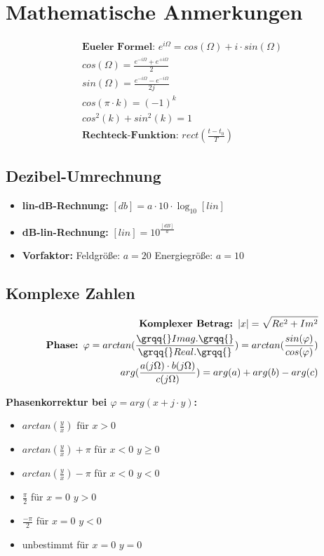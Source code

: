 \documentclass[10pt,a4paper]{article}
\begin{document}
\section{Mathematische Anmerkungen}
\begin{mdframed}[style=exercise]
    \begin{align}
     \textbf{Eueler Formel: } e^{i\Omega} = cos(\Omega) + i\cdot sin(\Omega)\\
     cos(\Omega) = \frac{e^{-i\Omega}+e^{+i\Omega}}{2}\\
     sin(\Omega) = \frac{e^{-i\Omega}-e^{-i\Omega}}{2j}\\
     cos(\pi\cdot k) = (-1)^{k}\\
     cos^{2}(k)+sin^{2}(k)=1\\
    \textbf{Rechteck-Funktion: } rect(\frac{t-t_{0}}{T})
    \end{align}
\end{mdframed}

\subsection{Dezibel-Umrechnung}
\begin{itemize}
	\item \textbf{lin-dB-Rechnung: }$[db]=a\cdot 10\cdot \log_{10}[lin]$
    	\item \textbf{dB-lin-Rechnung: }$[lin]=10^{\frac{[dB]}{a}}$
    	\item \textbf{Vorfaktor: } Feldgröße: $a=20$ Energiegröße: $a=10$
\end{itemize}

\subsection{Komplexe Zahlen}
\begin{mdframed}[style=exercise]
    \begin{align}
    \textbf{Komplexer Betrag: } \abs{x} = \sqrt{Re^{2}+Im^{2}}\\
    \textbf{Phase: } \varphi = arctan(\frac{\grqq{}Imag.\grqq{}}{\grqq{}Real.\grqq{}})=arctan(\frac{sin(\varphi)}{cos(\varphi)})\\
    arg(\frac{a(j\Omega)\cdot b(j\Omega)}{c(j\Omega)})=arg(a)+arg(b)-arg(c)
    \end{align}
\end{mdframed}

\textbf{Phasenkorrektur bei $\varphi=arg(x+j\cdot y)$: }
\begin{itemize}
	\item $arctan(\frac{y}{x})$ für $x > 0$ 
	\item $arctan(\frac{y}{x}) + \pi$ für $x < 0$ $y \geq 0$ 
	\item $arctan(\frac{y}{x}) - \pi$ für $x < 0$ $y < 0$ 
	\item $\frac{\pi}{2}$ für $x = 0$ $y > 0$
	\item $\frac{-\pi}{2}$ für $x = 0$ $y < 0$
	\item unbestimmt für $x = 0$ $y = 0$
\end{itemize}
\end{document}
